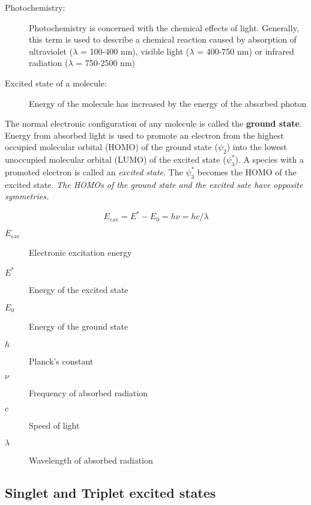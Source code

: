 \documentclass[ignorenonframetext]{beamer}
\begin{document}
\begin{frame}
 \begin{description}
  \item[Photochemistry:] Photochemistry is concerned with the chemical effects of light. Generally, this term is used to      describe a chemical reaction caused by absorption of ultraviolet (\(\lambda\) = 100-400 nm), visible light (\(\lambda\) = 400-750 nm) or infrared radiation (\(\lambda\) = 750-2500 nm)
  \item[Excited state of a molecule:] Energy of the molecule has increased by the energy of the absorbed photon \\
  
 \end{description}
\end{frame}

The normal electronic configuration of any molecule is called the \textbf{ground state}. Energy from absorbed light is used to promote an electron from the highest occupied molecular orbital (HOMO) of the ground state (\(\psi_2\)) into the lowest unoccupied molecular orbital (LUMO) of the excited state (\(\psi_3^*\)). A species with a promoted electron is called an \emph{excited state}. The \(\psi_3^*\) becomes the HOMO of the excited state. \emph{The HOMOs of the ground state and the excited sate have opposite symmetries.}


\begin{frame}
\[ E_{exc} = E^* - E_0 = h\nu = hc/\lambda \]  
  \begin{description}
    \item[\(E_{exc}\)] Electronic excitation energy
    \item[\(E^*\)] Energy of the excited state		
    \item[\(E_0\)] Energy of the ground state
    \item[\(h\)] Planck’s constant
    \item[\(\nu\)] Frequency of absorbed radiation
    \item[	\(c\)] Speed of light
    \item[	\(\lambda\)] Wavelength of absorbed radiation
  \end{description}
\end{frame}

\subsection{Singlet and Triplet excited states}
\end{document}
